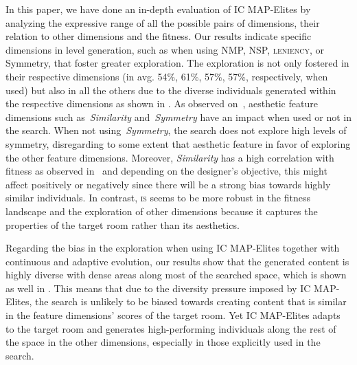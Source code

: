 In this paper, we have done an in-depth evaluation of IC MAP-Elites by analyzing the expressive range of all the possible pairs of dimensions, their relation to other dimensions and the fitness. %
Our results indicate specific dimensions in level generation, such as when using NMP, NSP, \textsc{leniency}, or Symmetry, that foster greater exploration. The exploration is not only fostered in their respective dimensions (in avg. 54\%, 61\%, 57\%, 57\%, respectively, when used) but also in all the others due to the diverse individuals generated within the respective dimensions as shown in . As observed on~, aesthetic feature dimensions such as~\emph{Similarity} and~\emph{Symmetry} have an impact when used or not in the search. When not using~\emph{Symmetry}, the search does not explore high levels of symmetry, disregarding to some extent that aesthetic feature in favor of exploring the other feature dimensions. Moreover, \emph{Similarity} has a high correlation with fitness as observed in~ and depending on the designer's objective, this might affect positively or negatively since there will be a strong bias towards highly similar individuals. In contrast, \textsc{is} seems to be more robust in the fitness landscape and the exploration of other dimensions because it captures the properties of the target room rather than its aesthetics. 

Regarding the bias in the exploration when using IC MAP-Elites together with continuous and adaptive evolution, our results show that the generated content is highly diverse with dense areas along most of the searched space, which is shown as well in . This means that due to the diversity pressure imposed by IC MAP-Elites, the search is unlikely to be biased towards creating content that is similar in the feature dimensions' scores of the target room. Yet IC MAP-Elites adapts to the target room and generates high-performing individuals along the rest of the space in the other dimensions, especially in those explicitly used in the search.

